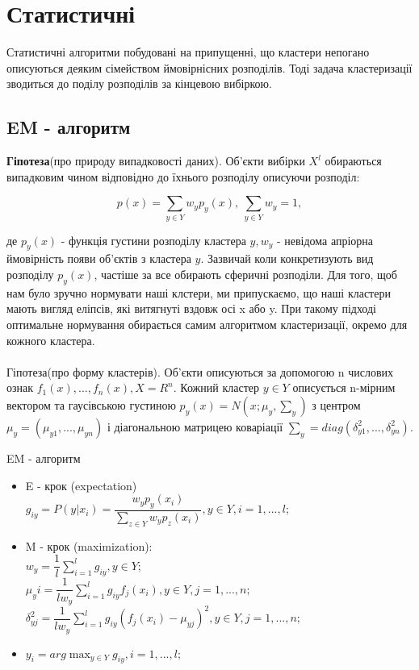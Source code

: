 \documentclass[a4paper,14pt,russian]{extreport}
\begin{document}
	\section{Статистичні}
	Статистичні алгоритми побудовані на припущенні, що кластери непогано описуються деяким сімейством ймовірнісних розподілів. Тоді задача кластеризації зводиться до поділу розподілів за кінцевою вибіркою.
	\subsection{EM - алгоритм}
	\textbf{Гіпотеза}(про природу випадковості даних). Об'єкти вибірки  $X^l$ обираються випадковим чином відповідно до їхнього розподілу описуючи розподіл:
	
	$$ p(x) = \sum_{y \in Y}w_y p_y (x), \ \sum_{y \in Y}w_y = 1,$$
	
	де $p_{y}(x)$ - функція густини розподілу кластера $y, w_y$ - невідома апріорна ймовірність появи об'єктів з кластера $y$. Зазвичай коли конкретизують вид розподілу $p_y(x)$, частіше за все обирають сферичні розподіли. Для того, щоб нам було зручно нормувати наші клстери, ми припускаємо, що наші кластери мають вигляд еліпсів, які витягнуті вздовж осі x або y. При такому підході оптимальне нормування обирається самим алгоритмом кластеризації, окремо для кожного кластера.\cite{voron} \\ \\
	Гіпотеза(про форму кластерів). Об'єкти описуються за допомогою n числових ознак $f_1(x),...,f_n(x), X= R^n $. Кожний кластер $y \in Y$ описується n-мірним вектором та гаусівською густиною $p_y(x) = N (x;\mu_y, \sum_{y})$ з центром $ \mu_{y} = (\mu_{y1}, ..., \mu_{yn})$ і діагональною матрицею коваріації $\sum_{y} = diag(\delta_{y1}^2,...,\delta_{yn}^2)$.
	\par EM - алгоритм
	
	\begin{itemize}
		
		\item E - крок	(expectation)\\
		$g_{iy} = P(y|x_i) = \dfrac{w_y p_y(x_i)}{\sum_{z \in Y} w_y p_z(x_i)}, y \in Y, i = 1,...,l;$
		\item M - крок (maximization): \\
			$w_y = \dfrac{1}{l} \sum_{i=1}^{l} g_{iy}, y \in Y;$\\
			$\mu_yi = \dfrac{1}{lw_y} \sum_{i=1}^{l} g_{iy} f_j(x_i), y \in Y, j =1,...,n;$\\
			$\delta_{yj}^{2} = \dfrac{1}{lw_y} \sum_{i=1}^{l} g_{iy}(f_j(x_i) - \mu_{yj})^2, y \in Y,  j =1,...,n; $
			
			\item 
			$y_i = arg \max_{y \in Y} g_{iy}, i=1,...,l;$
	
	
	\end{itemize}
	
\end{document}
